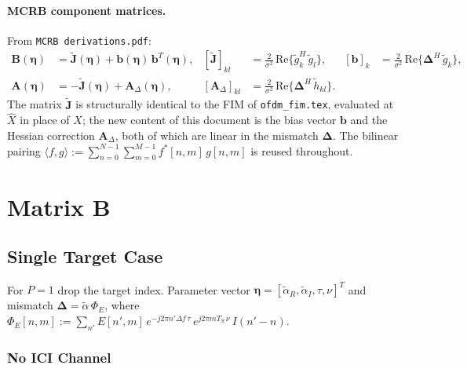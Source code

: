 \documentclass[11pt]{article}
\begin{document}
\paragraph{MCRB component matrices.} From \texttt{MCRB derivations.pdf}:
\begin{align}
    \bm{B}(\bm{\eta}) &= \tilde{\bm{J}}(\bm{\eta}) + \bm{b}(\bm{\eta})\, \bm{b}^T(\bm{\eta}), & [\tilde{\bm{J}}]_{kl} &= \tfrac{2}{\sigma^2}\, \mathrm{Re}\{\tilde{g}_k^H\, \tilde{g}_l\}, & [\bm{b}]_k &= \tfrac{2}{\sigma^2}\, \mathrm{Re}\{\bm{\Delta}^H\, \tilde{g}_k\}, \\
    \bm{A}(\bm{\eta}) &= -\tilde{\bm{J}}(\bm{\eta}) + \bm{A}_\Delta(\bm{\eta}), & [\bm{A}_\Delta]_{kl} &= \tfrac{2}{\sigma^2}\, \mathrm{Re}\{\bm{\Delta}^H\, \tilde{h}_{kl}\}. & &
\end{align}
The matrix \(\tilde{\bm{J}}\) is structurally identical to the FIM of \texttt{ofdm\_fim.tex}, evaluated at \(\hat{X}\) in place of \(X\); the new content of this document is the bias vector \(\bm{b}\) and the Hessian correction \(\bm{A}_\Delta\), both of which are linear in the mismatch \(\bm{\Delta}\). The bilinear pairing \(\langle f, g \rangle := \sum_{n=0}^{N-1}\sum_{m=0}^{M-1} f^*[n,m]\, g[n,m]\) is reused throughout.

\section{Matrix B}

\subsection{Single Target Case}

For \(P=1\) drop the target index. Parameter vector \(\bm{\eta} = [\tilde{\alpha}_R, \tilde{\alpha}_I, \tau, \nu]^T\) and mismatch \(\bm{\Delta} = \tilde{\alpha}\, \Phi_E\), where \(\Phi_E[n,m] := \sum_{n'} E[n',m]\, e^{-j2\pi n'\Delta f\, \tau}\, e^{j2\pi m T_S\, \nu}\, I(n'-n)\).

\subsubsection{No ICI Channel}
\end{document}
